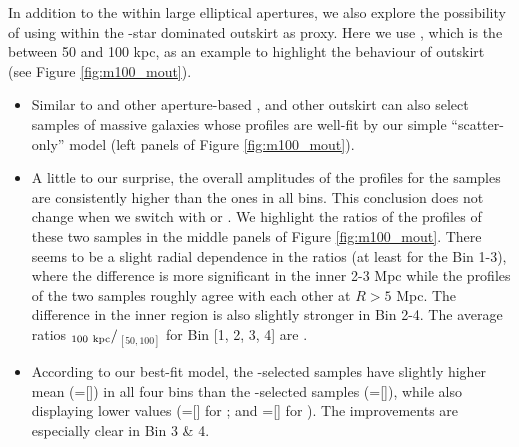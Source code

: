 \documentclass[a4paper,fleqn,usenatbib]{mnras}
\begin{document}

    

    In addition to the \mstar{} within large elliptical apertures, we also explore the possibility
    of using \mstar{} within the \exsitu{}-star dominated outskirt as \mvir{} proxy.
    Here we use , which is the \mstar{} between 50 and 100 kpc, as an example to
    highlight the behaviour of outskirt \mstar{} (see Figure \ref{fig:m100_mout}).

    \begin{itemize}

        \item Similar to  and other aperture-based \mstar{},  and other
            outskirt \mstar{} can also select samples of massive galaxies whose \dsigma{} profiles
            are well-fit by our simple ``scatter-only'' model (left panels of
            Figure \ref{fig:m100_mout}).

        \item A little to our surprise, the overall amplitudes of the \dsigma{} profiles for the
             samples are consistently higher than the  ones in all
            bins. This conclusion does not change when we switch  with  or
            \mmax{}. We highlight the ratios of the \dsigma{} profiles of these two samples in
            the middle panels of Figure \ref{fig:m100_mout}.
            There seems to be a slight radial dependence in the ratios (at least for the Bin
            1-3), where the difference is more significant in the inner 2-3 Mpc while the
            \dsigma{} profiles of the two samples roughly agree with each other at $R>5$ Mpc.
            The difference in the inner region is also slightly stronger in Bin 2-4.
            The average ratios \dsigma{}$_{100\ \rm kpc}/$\dsigma{}$_[50,100]$ for Bin [1, 2, 3, 4]
            are .

        \item According to our best-fit model, the -selected samples have slightly 
            higher mean \mvir{} (\logmvir{}=[]) in all four bins than the 
            -selected samples (\logmvir{}=[]), while also 
            displaying lower \sigmh{} values 
            (\sigmh{}=[] for ; and
             \sigmh{}=[] for ). 
            The improvements are especially clear in Bin 3 \& 4.
        


\end{itemize}
\end{document}
